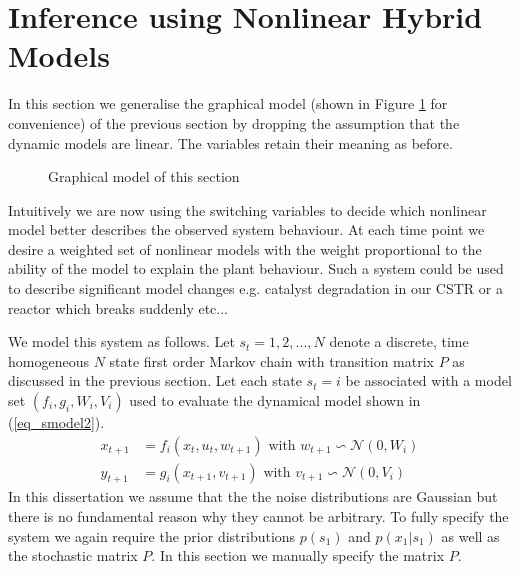 \section{Inference using Nonlinear Hybrid Models}
In this section we generalise the graphical model (shown in Figure \ref{fig_hybridmod2} for convenience) of the previous section by dropping the assumption that the dynamic models are linear. The variables retain their meaning as before.     
\begin{figure}[H] 
\centering
{}
\caption{Graphical model of this section}
\label{fig_hybridmod2}
\end{figure}
Intuitively we are now using the switching variables to decide which nonlinear model better describes the observed system behaviour. At each time point we desire a weighted set of nonlinear models with the weight proportional to the ability of the model to explain the plant behaviour. Such a system could be used to describe significant model changes e.g. catalyst degradation in our CSTR or a reactor which breaks suddenly etc... 

We model this system as follows. Let $s_t=1,2,..., N$ denote a discrete, time homogeneous $N$ state first order Markov chain with transition matrix $P$ as discussed in the previous section. Let each state $s_t=i$ be associated with a model set $\left(f_i, g_i, W_i, V_i \right)$ used to evaluate the dynamical model shown in (\ref{eq_smodel2}).
\begin{equation}
\begin{aligned}
x_{t+1} &= f_i(x_t, u_t, w_{t+1}) \text{ with } w_{t+1} \backsim \mathcal{N}(0, W_i)\\
y_{t+1} &= g_i(x_{t+1}, v_{t+1}) \text{ with } v_{t+1} \backsim \mathcal{N}(0,V_i)
\end{aligned}
\label{eq_smodel2}
\end{equation}
In this dissertation we assume that the the noise distributions are Gaussian but there is no fundamental reason why they cannot be arbitrary. To fully specify the system we again require the prior distributions $p(s_1)$ and $p(x_1|s_1)$ as well as the stochastic matrix $P$. In this section we manually specify the matrix $P$. 

